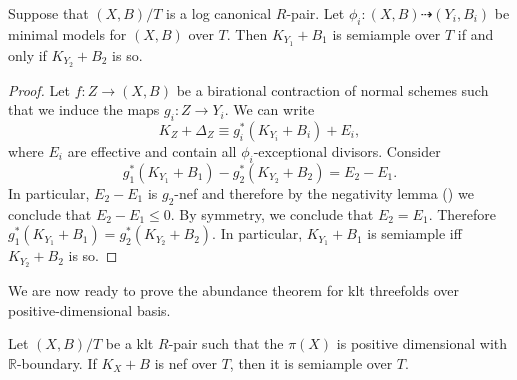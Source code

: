 \documentclass[a4paper,12pt]{book}
\begin{document}
	\begin{lemma}\label{inv}
		Suppose that $(X,B)/T$ is a log canonical $R$-pair. 
		Let $\phi_{i} \colon (X, B) \dashrightarrow (Y_{i},B_{i})$ be minimal models for $(X,B)$ over $T$. 
		Then $K_{Y_{1}}+B_{1}$ is semiample over $T$ if and only if $K_{Y_{2}}+B_{2}$ is so.
	\end{lemma}
	\begin{proof}
		
		Let $f \colon Z \to (X,B)$ be a birational contraction of normal schemes such that we induce the maps $g_i \colon Z \to Y_i$. We can write
		$$K_Z+\Delta_Z \equiv g_i^*(K_{Y_i}+B_i) + E_i,$$
		where $E_i$ are effective and contain all $\phi_i$-exceptional divisors.
		Consider 
		$$g_1^*(K_{Y_1}+B_1)-g_2^*(K_{Y_2}+B_2)=E_2-E_1. $$
		In particular, $E_2-E_1$ is $g_2$-nef and therefore by the negativity lemma (\cite[Lemma 2.14]{bhatt2020}) we conclude that $E_2 -E_1 \leq 0$. By symmetry, we conclude that $E_2=E_1$. Therefore $g_1^*(K_{Y_1}+B_1)=g_2^*(K_{Y_2}+B_2)$. In particular, $K_{Y_1}+B_1$ is semiample  iff $K_{Y_2}+B_2$ is so.
	\end{proof}
	
	We are now ready to prove the abundance theorem for klt threefolds over positive-dimensional basis.
	
	\begin{theorem}\label{abundance}
		Let $(X,B)/T$ be a klt $R$-pair such that the $\pi(X)$ is positive dimensional with $\mathbb{R}$-boundary. If $K_X+B$ is nef over $T$, then it is semiample over $T$.
	\end{theorem}
	
\end{document}
